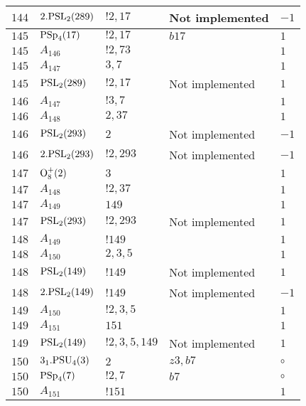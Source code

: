 \documentclass[a4paper, 11pt]{article}
\begin{document}
\begin{longtable}{lllll}
        $ 144 $ & $ 2.{\rm PSL}_{2}(289) $ & $ !2, 17 $ &  Not implemented & $ -1$ \\ \hline
        $ 145 $ & $ {\rm PSp}_{4}(17) $ & $ ! 2,17 $ & $ b17 $ & $ 1$ \\ \hline
        $ 145 $ & $ A_{146} $ & $ !2, 73 $ & $ ~ $ & $ 1$ \\ \hline
        $ 145 $ & $ A_{147} $ & $ 3, 7 $ & $ ~ $ & $ 1$ \\ \hline
        $ 145 $ & $ {\rm PSL}_{2}(289) $ & $ !2, 17 $ &  Not implemented & $ 1$ \\ \hline
        $ 146 $ & $ A_{147} $ & $ !3, 7 $ & $ ~ $ & $ 1$ \\ \hline
        $ 146 $ & $ A_{148} $ & $ 2, 37 $ & $ ~ $ & $ 1$ \\ \hline
        $ 146 $ & $ {\rm PSL}_{2}(293) $ & $ 2 $ &  Not implemented & $ -1$ \\ \hline
        $ 146 $ & $ 2.{\rm PSL}_{2}(293) $ & $ !2, 293 $ &  Not implemented & $ -1$ \\ \hline
        $ 147 $ & $ {\rm O}_{8}^+(2) $ & $ 3 $ & $ ~ $ & $ 1$ \\ \hline
        $ 147 $ & $ A_{148} $ & $ !2, 37 $ & $ ~ $ & $ 1$ \\ \hline
        $ 147 $ & $ A_{149} $ & $ 149 $ & $ ~ $ & $ 1$ \\ \hline
        $ 147 $ & $ {\rm PSL}_{2}(293) $ & $ !2, 293 $ &  Not implemented & $ 1$ \\ \hline
        $ 148 $ & $ A_{149} $ & $ !149 $ & $ ~ $ & $ 1$ \\ \hline
        $ 148 $ & $ A_{150} $ & $ 2, 3, 5 $ & $ ~ $ & $ 1$ \\ \hline
        $ 148 $ & $ {\rm PSL}_{2}(149) $ & $ !149 $ &  Not implemented & $ 1$ \\ \hline
        $ 148 $ & $ 2.{\rm PSL}_{2}(149) $ & $ !149 $ &  Not implemented & $ -1$ \\ \hline
        $ 149 $ & $ A_{150} $ & $ !2, 3, 5 $ & $ ~ $ & $ 1$ \\ \hline
        $ 149 $ & $ A_{151} $ & $ 151 $ & $ ~ $ & $ 1$ \\ \hline
        $ 149 $ & $ {\rm PSL}_{2}(149) $ & $ !2, 3, 5, 149 $ &  Not implemented & $ 1$ \\ \hline
        $ 150 $ & $ 3_1.{\rm PSU}_{4}(3) $ & $ 2 $ & $ z3, b7 $ &  $\circ$ \\ \hline
        $ 150 $ & $ {\rm PSp}_{4}(7) $ & $ ! 2,7 $ & $ b7 $ &  $\circ$ \\ \hline
        $ 150 $ & $ A_{151} $ & $ !151 $ & $ ~ $ & $ 1$ \\ \hline

\end{longtable}
\end{document}
